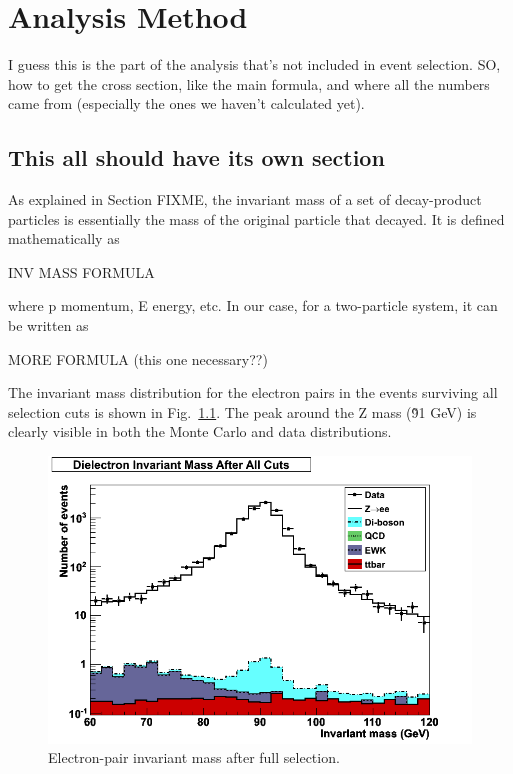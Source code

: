 \chapter{Analysis Method}
\label{anMeth}
I guess this is the part of the analysis that's not included in event selection.  
SO, how to get the cross section, like the main formula, 
and where all the numbers came from (especially the ones we haven't calculated yet).


\section{This all should have its own section}

As explained in Section FIXME, 
the invariant mass of a set of decay-product particles is 
essentially the mass of the original particle that decayed. 
It is defined mathematically as 

INV MASS FORMULA

where p momentum, E energy, etc. 
In our case, for a two-particle system, it can be written as 

MORE FORMULA (this one necessary??)

The invariant mass distribution for the electron pairs 
in the events surviving all selection cuts is shown in 
Fig.~\ref{fig:InvMass}.  
The peak around the Z mass (\~91 GeV) is clearly visible 
in both the Monte Carlo and data distributions.  



 \begin{figure}[htb]
  \begin{center}
    \includegraphics[width=360pt]{Figures/invMass-04Apr11.png}
  \end{center}
  \caption[Electron-pair invariant mass after full selection]{Electron-pair invariant mass after full selection.}
  \label{fig:InvMass}
 \end{figure}

